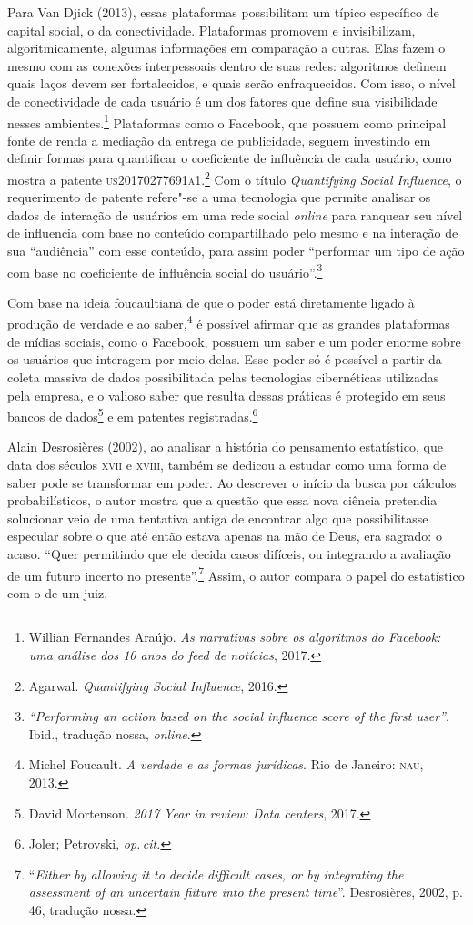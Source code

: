 Para Van Djick (2013), essas plataformas possibilitam um típico
específico de capital social, o da conectividade. Plataformas promovem e
invisibilizam, algoritmicamente, algumas informações em comparação a
outras. Elas fazem o mesmo com as conexões interpessoais dentro de suas
redes: algoritmos definem quais laços devem ser fortalecidos, e quais
serão enfraquecidos. Com isso, o nível de conectividade de cada usuário
é um dos fatores que define sua visibilidade nesses ambientes.\footnote{Willian Fernandes Araújo. \emph{As narrativas sobre os algoritmos do Facebook: uma
análise dos 10 anos do feed de notícias}, 2017.} %
Plataformas como o Facebook, que possuem como
principal fonte de renda a mediação da entrega de publicidade, seguem
investindo em definir formas para quantificar o coeficiente de
influência de cada usuário, como mostra a patente \textsc{us20170277691a1}.\footnote{Agarwal. \emph{Quantifying Social Influence}, 2016.}
Com o título \emph{Quantifying Social Influence}, o
requerimento de patente refere"-se a uma tecnologia que permite analisar
os dados de interação de usuários em uma rede social \emph{online} para
ranquear seu nível de influencia com base no conteúdo compartilhado pelo
mesmo e na interação de sua ``audiência'' com esse conteúdo, para assim
poder ``performar um tipo de ação com base no coeficiente de influência
social do usuário''.\footnote{\emph{``Performing an action based on the social influence score of the first user''}. Ibid., tradução nossa, \emph{online}.}

Com base na ideia foucaultiana de que o poder está diretamente ligado à
produção de verdade e ao saber,\footnote{Michel Foucault. \emph{A verdade e as formas jurídicas}. Rio de Janeiro: \textsc{nau}, 2013.}
é possível afirmar que as grandes plataformas de mídias sociais, como o
Facebook, possuem um saber e um poder enorme sobre os usuários que
interagem por meio delas. Esse poder só é possível a partir da coleta
massiva de dados possibilitada pelas tecnologias cibernéticas utilizadas
pela empresa, e o valioso saber que resulta dessas práticas é protegido
em seus bancos de dados\footnote{David Mortenson. \emph{2017 Year in review: Data centers}, 2017.} e em patentes registradas.\footnote{Joler; Petrovski, \textit{op.\,cit.}}

Alain Desrosières (2002), ao analisar a história do pensamento estatístico, que data dos séculos
\textsc{xvii} e \textsc{xviii}, também se dedicou a estudar como uma forma de saber pode
se transformar em poder. Ao descrever o início da busca por cálculos
probabilísticos, o autor mostra que a questão que essa nova ciência
pretendia solucionar veio de uma tentativa antiga de encontrar algo que
possibilitasse especular sobre o que até então estava apenas na mão de
Deus, era sagrado: o acaso. ``Quer permitindo que ele decida casos
difíceis, ou integrando a avaliação de um futuro incerto no
presente''.\footnote{``\emph{Either by allowing it to decide difficult cases,
  or by integrating the assessment of an uncertain fiiture into the
  present time}''. Desrosières, 2002, p.\,46, tradução nossa.} Assim, o autor compara o papel
do estatístico com o de um juiz.

